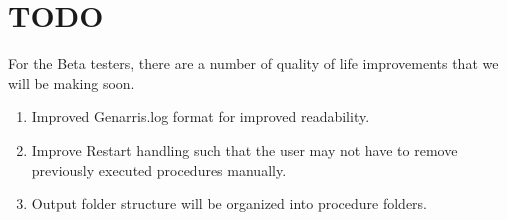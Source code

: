 \documentclass[letterpaper,10pt,english]{sphinxmanual}
\begin{document}
\chapter{TODO}
\label{\detokenize{index:todo}}
For the Beta testers, there are a number of quality of life improvements that
we will be making soon.
\begin{enumerate}
%
\item {} 
Improved Genarris.log format for improved readability.

\item {} 
Improve Restart handling such that the user may not have to remove previously
executed procedures manually.

\item {} 
Output folder structure will be organized into procedure folders.

\end{enumerate}



\renewcommand{\indexname}{Index}
\printindex
\end{document}

